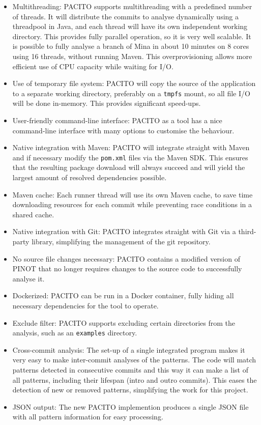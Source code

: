\begin{itemize}
    \item Multithreading: PACITO supports multithreading with a predefined number of threads. It will distribute the commits to analyse dynamically using a threadpool in Java, and each thread will have its own independent working directory. This provides fully parallel operation, so it is very well scalable. It is possible to fully analyse a branch of Mina in about 10 minutes on 8 cores using 16 threads, without running Maven. This overprovisioning allows more efficient use of CPU capacity while waiting for I/O.
    \item Use of temporary file system: PACITO will copy the source of the application to a separate working directory, preferably on a {\tt tmpfs} mount, so all file I/O will be done in-memory. This provides significant speed-ups.
    \item User-friendly command-line interface: PACITO as a tool has a nice command-line interface with many options to customise the behaviour.
    \item Native integration with Maven: PACITO will integrate straight with Maven and if necessary modify the {\tt pom.xml} files via the Maven SDK. This ensures that the resulting package download will always succeed and will yield the largest amount of resolved dependencies possible.
    \item Maven cache: Each runner thread will use its own Maven cache, to save time downloading resources for each commit while preventing race conditions in a shared cache.
    \item Native integration with Git: PACITO integrates straight with Git via a third-party library, simplifying the management of the git repository.
    \item No source file changes necessary: PACITO contains a modified version of PINOT that no longer requires changes to the source code to successfully analyse it.
    \item Dockerized: PACITO can be run in a Docker container, fully hiding all necessary dependencies for the tool to operate.
    \item Exclude filter: PACITO supports excluding certain directories from the analysis, such as an {\tt examples} directory.
    \item Cross-commit analysis: The set-up of a single integrated program makes it very easy to make inter-commit analyses of the patterns. The code will match patterns detected in consecutive commits and this way it can make a list of all patterns, including their lifespan (intro and outro commits). This eases the detection of new or removed patterns, simplifying the work for this project.
    \item JSON output: The new PACITO implemention produces a single JSON file with all pattern information for easy processing.
\end{itemize}

